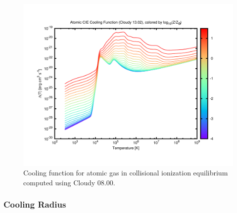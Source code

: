 \begin{figure}
 \begin{center}
 \includegraphics[width=160mm]{../plots/cooling_function_Atomic_CIE_Cloudy.pdf}
 \end{center}
 \caption{Cooling function for atomic gas in collisional ionization equilibrium computed using Cloudy 08.00.}
 \label{fig:atomicCIECloudyCoolingFunction}
\end{figure}

\subsubsection{Cooling Radius}

